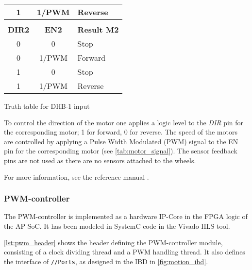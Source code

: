 \documentclass[Main]{subfiles}
\begin{document}
\begin{table}[h]
\begin{subtable}[b]{0.3\linewidth}
\begin{tabular}{ccl}
						\multicolumn{1}{|c|}{1}          & \multicolumn{1}{c|}{1/PWM}     & \multicolumn{1}{l|}{Reverse}         \\ \hline
						                                 &                                &                                      \\ \hline
						\multicolumn{1}{|c|}{{\bf DIR2}} & \multicolumn{1}{c|}{{\bf EN2}} & \multicolumn{1}{l|}{{\bf Result M2}} \\ \hline
						\multicolumn{1}{|c|}{0}          & \multicolumn{1}{c|}{0}         & \multicolumn{1}{l|}{Stop}            \\ \hline
						\multicolumn{1}{|c|}{0}          & \multicolumn{1}{c|}{1/PWM}     & \multicolumn{1}{l|}{Forward}         \\ \hline
						\multicolumn{1}{|c|}{1}          & \multicolumn{1}{c|}{0}         & \multicolumn{1}{l|}{Stop}            \\ \hline
						\multicolumn{1}{|c|}{1}          & \multicolumn{1}{c|}{1/PWM}     & \multicolumn{1}{l|}{Reverse}         \\ \hline
					\end{tabular}
					\caption{Truth table for DHB-1 input}
					\label{tab:motor_signal}
				\end{subtable}
				\caption{} 
			\end{table} 

			To control the direction of the motor one applies a logic level to the \emph{DIR} pin for the corresponding motor; 1 for forward, 0 for reverse.
			The speed of the motors are controlled by applying a Pulse Width Modulated (PWM) signal to the EN pin for the corresponding motor (see \autoref{tab:motor_signal}).
			The sensor feedback pins are not used as there are no sensors attached to the wheels.

			For more information, see the reference manual \cite{Digilent2013}.


		\subsubsection{PWM-controller} %
		\label{ssub:pwm_controller}
			
			The PWM-controller is implemented as a hardware IP-Core in the FPGA logic of the AP SoC.
			It has been modeled in SystemC code in the Vivado HLS tool.

			\autoref{lst:pwm_header} shows the header defining the PWM-controller module, consisting of a clock dividing thread and a PWM handling thread.
			It also defines the interface of \texttt{//Ports}, as designed in the IBD in \autoref{fig:motion_ibd}.
\end{document}
